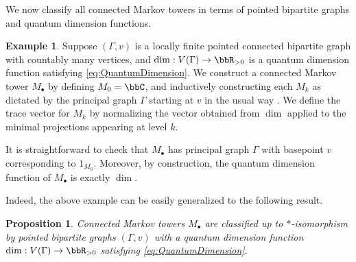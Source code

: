 \documentclass[11pt]{article}
\theoremstyle{plain}
\newtheorem{prop}[thm]{Proposition}
\theoremstyle{definition}
\newtheorem{ex}[thm]{Example}
\DeclareMathOperator{\tr}{tr}
\newcommand{\nn}[1]{\textcolor{red}{[[#1]]}}
\begin{document}
We now classify all connected Markov towers in terms of pointed bipartite graphs and quantum dimension functions.

\begin{ex}
Suppose $(\Gamma, v)$ is a locally finite pointed connected bipartite graph with countably many vertices, and $\dim : V(\Gamma) \to \bbR_{>0}$ is a quantum dimension function satisfying \eqref{eq:QuantumDimension}.
We construct a connected Markov tower $M_\bullet$ by defining $M_0 = \bbC$, and inductively constructing each $M_k$ as dictated by the principal graph $\Gamma$ starting at $v$ in the usual way \cite{MR999799,MR1473221}.
We define the trace vector for $M_k$ by normalizing the vector obtained from $\dim$ applied to the minimal projections appearing at level $k$.

It is straightforward to check that $M_\bullet$ has principal graph $\Gamma$ with basepoint $v$ corresponding to $1_{M_0}$.
Moreover, by construction, the quantum dimension function of $M_\bullet$ is exactly $\dim$.
\end{ex}

Indeed, the above example can be easily generalized to the following result.

\begin{prop}
\label{prop:ClassificationOfMarkovTowers}
Connected Markov towers $M_\bullet$ are classified up to $*$-isomorphism by pointed bipartite graphs $(\Gamma,v)$ with a quantum dimension function $\dim: V(\Gamma) \to \bbR_{>0}$ satisfying \eqref{eq:QuantumDimension}.
\end{prop}
%
%
\end{document}
